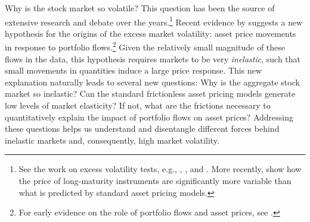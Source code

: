 \noindent Why is the stock market so volatile? 
This question has been the source of extensive research and  debate over the years.\footnote{See the work on excess volatility tests, e.g., \cite{leroy1981present}, \cite{shiller1981,shiller1992market}, and \cite{cochrane1992explaining}. %
More recently, \citet{giglio2018excess} show how the price of long-maturity instruments are significantly more variable than what is predicted by standard asset pricing models. }
Recent evidence by \citet{gabaix2020search} suggests a new hypothesis for the origins of the excess market volatility: asset price movements in response to portfolio flows.\footnote{For early evidence on the role of portfolio flows and asset prices, see \citet{Deuskar/Johnson/2011}.}
Given the relatively small magnitude of these flows in the data, this hypothesis requires markets to be very \textit{inelastic}, such that small movements in quantities induce a large price response. 
This new explanation naturally leads to several new questions: Why is the aggregate stock market so inelastic? Can the standard frictionless asset pricing models generate low levels of market elasticity? 
If not, what are the frictions necessary to quantitatively explain the impact of portfolio flows on asset prices? 
Addressing these questions helps us understand and disentangle different forces behind inelastic markets and, consequently, high market volatility. 


